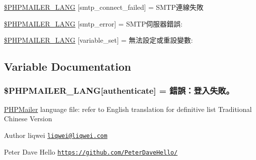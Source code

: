 \begin{DoxyCompactItemize}
\item 
\hyperlink{phpmailer_8lang-zh_8php_a7b321d4ca1e9df702403ed4c61aa0980}{\$\+P\+H\+P\+M\+A\+I\+L\+E\+R\+\_\+\+L\+A\+NG} \mbox{[}\textquotesingle{}smtp\+\_\+connect\+\_\+failed\textquotesingle{}\mbox{]} = \textquotesingle{}S\+M\+T\+P連線失敗\textquotesingle{}
\item 
\hyperlink{phpmailer_8lang-zh_8php_a7d9cffba1e669c845f8a4c891ee50064}{\$\+P\+H\+P\+M\+A\+I\+L\+E\+R\+\_\+\+L\+A\+NG} \mbox{[}\textquotesingle{}smtp\+\_\+error\textquotesingle{}\mbox{]} = \textquotesingle{}S\+M\+T\+P伺服器錯誤\+: \textquotesingle{}
\item 
\hyperlink{phpmailer_8lang-zh_8php_af795debc7a739d038742691c358d9032}{\$\+P\+H\+P\+M\+A\+I\+L\+E\+R\+\_\+\+L\+A\+NG} \mbox{[}\textquotesingle{}variable\+\_\+set\textquotesingle{}\mbox{]} = \textquotesingle{}無法設定或重設變數\+: \textquotesingle{}
\end{DoxyCompactItemize}


\subsection{Variable Documentation}
\subsubsection[{\texorpdfstring{\$\+P\+H\+P\+M\+A\+I\+L\+E\+R\+\_\+\+L\+A\+NG}{$PHPMAILER_LANG}}]{\setlength{\rightskip}{0pt plus 5cm}\$P\+H\+P\+M\+A\+I\+L\+E\+R\+\_\+\+L\+A\+NG\mbox{[}\textquotesingle{}authenticate\textquotesingle{}\mbox{]} =  錯誤：登入失敗。\textquotesingle{}}\hypertarget{phpmailer_8lang-zh_8php_a2cb33073c989b85580748e331ed8b4aa}{}\label{phpmailer_8lang-zh_8php_a2cb33073c989b85580748e331ed8b4aa}
\hyperlink{class_p_h_p_mailer}{P\+H\+P\+Mailer} language file\+: refer to English translation for definitive list Traditional Chinese Version \begin{DoxyAuthor}{Author}
liqwei \href{mailto:liqwei@liqwei.com}{\tt liqwei@liqwei.\+com} 

Peter Dave Hello \href{https://github.com/PeterDaveHello/}{\tt https\+://github.\+com/\+Peter\+Dave\+Hello/} 
\end{DoxyAuthor}


